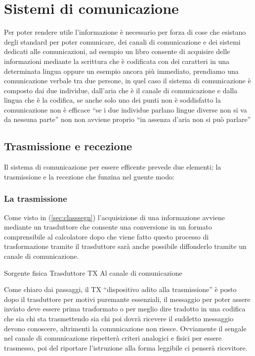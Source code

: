 \section{Sistemi di comunicazione}
\label{sec:siscom}
Per poter rendere utile l'informazione è necessario per forza di cose che esistano degli
standard per poter comunicare, dei canali di comunicazione e dei sistemi dedicati alle
comunicazioni, ad esempio un libro consente di acquisire delle informazioni mediante
la scrittura che è codificata con dei caratteri in una determinata lingua oppure
un esempio ancora più immediato, prendiamo una comunicazione verbale tra due persone,
in quel caso il sistema di comunicazione è composto dai due individue, dall'aria che è
il canale di comunicazione e dalla lingua che è la codifica, se anche solo uno dei punti
non è soddisfatto la comunicazione non è efficace ``se i due individue parlano lingue
diverse non si va da nessuna parte'' non non avviene proprio ``in assenza d'aria non
si può parlare''
\subsection{Trasmissione e recezione}
\label{sec:trasmerec}
Il sistema di comunicazione per essere efficente prevede due elementi; la trasmissione
e la recezione che funzina nel guente modo:

\subsubsection{La trasmissione}
\label{sec:trasm}
Come visto in (\ref{sec:classsegn}) l'acquisizione di una informazione avviene
mediante un trasduttore che consente una conversione in un formato comprensibile
al calcolatore dopo che viene fatto questo processo di trasformazione tramite il
trasduttore sarà anche possibile diffonderlo tramite un canale di comunicazione.
\begin{center}
  Sorgente fisica \textrightarrow{} Trasduttore \textrightarrow{} TX \textrightarrow{}
  Al canale di comunicazione
\end{center}
Come chiaro dai passaggi, il TX ``dispositivo adito alla trasmissione'' è posto dopo
il trasduttore per motivi puremante essenziali, il messaggio per poter assere inviato
deve essere prima trasformato o per meglio dire tradotto in una codifica che sia chi
sta trasmettendo sia chi poi dovrà ricevere il suddetto messaggio devono conoscere,
altrimenti la comunicazione non riesce. Ovviamente il sengale nel canale di
comunicazione rispetterà criteri analogici e fisici per essere trasmesso, poi del
riportare l'istruzione alla forma leggibile ci penserà ricevitore.
